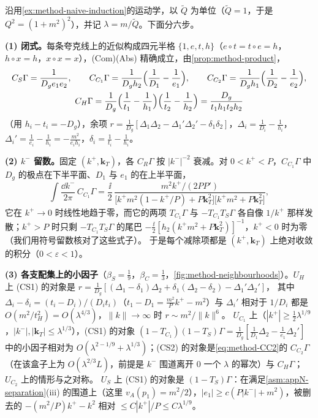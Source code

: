 \begin{example}\label{ex:method-sudakov-subtraction}
沿用\cref{ex:method-naive-induction}的运动学，以 $\tilde Q$ 为单位（$\tilde Q=1$，于是 $Q^2=(1+m^2)^2$），并记 $\lambda=m/\tilde Q$。下面分六步。

\textbf{(1) 闭式。}每条夸克线上的近似构成四元半格 $\{1,e,t,h\}$（$e\circ t=t\circ e=h$，$h\circ x=h$，$x\circ x=x$），(Com)(Abs) 精确成立，由\cref{prop:method-product}，
\begin{equation}\label{eq:method-tri-CR}
\begin{gathered}
C_S\Gamma=\frac1{D_ge_1e_2},\qquad C_{C_1}\Gamma=\frac1{D_gh_2}\Bigl(\frac1{D_1}-\frac1{e_1}\Bigr),\qquad C_{C_2}\Gamma=\frac1{D_gh_1}\Bigl(\frac1{D_2}-\frac1{e_2}\Bigr),\\
C_H\Gamma=\frac1{D_g}\Bigl(\frac1{t_1}-\frac1{h_1}\Bigr)\Bigl(\frac1{t_2}-\frac1{h_2}\Bigr)=\frac{D_g}{t_1h_1t_2h_2}
\end{gathered}
\end{equation}
（用 $h_i-t_i=-D_g$），余项 $r=\frac1{D_g}[\Delta_1\Delta_2-\Delta_1'\Delta_2'-\delta_1\delta_2]$，$\Delta_i=\frac1{D_i}-\frac1{h_i}$，$\Delta_i'=\frac1{e_i}-\frac1{h_i}=-\frac{m^2}{e_ih_i}$，$\delta_i=\frac1{t_i}-\frac1{h_i}$。

\textbf{(2) $k^-$ 留数。}固定 $(k^+,\mathbf k_T)$，各 $C_R\Gamma$ 按 $|k^-|^{-2}$ 衰减。对 $0<k^+<P$，$C_{C_1}\Gamma$ 中 $D_g$ 的极点在下半平面、$D_1$ 与 $e_1$ 的在上半平面，
\begin{equation}\label{eq:method-CC1-res}
\int\frac{\dd k^-}{2\pi}\,C_{C_1}\Gamma=\frac\ii2\,\frac{m^2k^+/(2PP')}{\bigl[k^+m^2(1-k^+/P)+P\mathbf k_T^2\bigr]\bigl[k^+m^2+P\mathbf k_T^2\bigr]} ,
\end{equation}
它在 $k^+\to0$ 时线性地趋于零，而它的两项 $T_{C_1}\Gamma$ 与 $-T_{C_1}T_S\Gamma$ 各自像 $1/k^+$ 那样发散；$k^+>P$ 时只剩 $-T_{C_1}T_S\Gamma$ 的尾巴 $-\frac\ii2[h_2(k^+m^2+P\mathbf k_T^2)]^{-1}$，$k^+<0$ 时为零
（我们用符号留数核对了这些式子）。%
于是每个减除项都是 $(k^+,\mathbf k_T)$ 上绝对收敛的积分（$0<\varepsilon<1$）。

\textbf{(3) 各支配集上的小因子}（$\beta_S=\frac19$，$\beta_C=\frac13$，\cref{fig:method-neighbourhoods}）。$U_H$ 上 (CS1) 的对象是 $r=\frac1{D_g}[(\Delta_1-\delta_1)\Delta_2+\delta_1(\Delta_2-\delta_2)-\Delta_1'\Delta_2']$，
其中 $\Delta_i-\delta_i=(t_i-D_i)/(D_it_i)$（$t_1-D_1=\frac{m^2}Pk^+-m^2$）与 $\Delta_i'$ 相对于 $1/D_i$ 都是 $O(m^2/t_H^2)=O(\lambda^{4/3})$，$\|k\|\to\infty$ 时 $r\sim m^2/\|k\|^6$。
$U_{C_1}$ 上（$|k^+|\ge\frac12\lambda^{1/9}$，$|k^-|,|\mathbf k_T|\le\lambda^{1/3}$），(CS1) 的对象 $(1-T_{C_1})(1-T_S)\Gamma=\frac1{D_g}[\frac1{D_1}\Delta_2-\frac1{e_1}\Delta_2']$ 中的小因子相对为
$O(\lambda^{2-1/9}+\lambda^{1/3})$；(CS2) 的对象是\cref{eq:method-CC2}的 $C_{C_2}\Gamma$（在该盒子上为 $O(\lambda^{2/3}L)$，前提是 $k^-$ 围道离开 $0$ 一个 $\lambda$ 的幂次）与 $C_H\Gamma$；$U_{C_2}$ 上的情形与之对称。
$U_S$ 上 (CS1) 的对象是 $(1-T_S)\Gamma$：在满足\cref{asm:appN-separation}(iii) 的围道上（这里 $v_A(p_1)=m^2/2$），$|e_1|\ge c(P|k^-|+m^2)$，被删去的 $-(m^2/P)k^+-k^2$ 相对 $\le C|k^+|/P\le C\lambda^{1/9}$。


\end{example}
